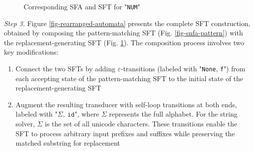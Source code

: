 \documentclass[sigplan,10pt,anonymous,review]{acmart}\settopmatter{printfolios=true,printccs=false,printacmref=false}
\begin{document}
\begin{figure}[h] \centering
{}
\caption{Corresponding SFA and SFT for "\texttt{NUM}"}
\label{fig-snfa-replacement}
\end{figure}


\noindent\emph{Step 3.}
Figure \ref{fig-rearranged-automata} presents the complete SFT construction, obtained by composing the pattern-matching SFT (Fig. \ref{fig-snfa-pattern}) with the replacement-generating SFT (Fig. \ref{fig-snfa-replacement}). The composition process involves two key modifications:
\begin{enumerate}
  \item Connect the two SFTs by adding $\varepsilon$-transitions (labeled with "\texttt{None}, \texttt{f}") from each accepting state of the pattern-matching SFT to the initial state of the replacement-generating SFT
  \item Augment the resulting transducer with self-loop transitions at both ends, labeled with "$\Sigma,~\texttt{id}$", where $\Sigma$ represents the full alphabet. For the string solver, $\Sigma$ is the set of all unicode characters. These transitions enable the SFT to process arbitrary input prefixes and suffixes while preserving the matched substring for replacement
\end{enumerate}
\end{document}
